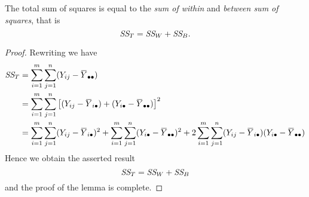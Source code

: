 \begin{lemma}
    \label{lem:an01}
    The total sum of squares is equal to the \textit{sum of within} and \textit{between sum of squares}, that is 
    \begin{equation}
        \textit{SS}_{T} = \textit{SS}_{W} + \textit{SS}_{B}.
    \end{equation}
\end{lemma}
\begin{proof}
    Rewriting we have 
    \begin{align*}
        \CS{T} &= \sum^m_{i=1} \sum^n_{j=1} (Y_{ij} - \ols{Y}_{\bullet \bullet })\\
        &= \sum^m_{i=1} \sum^n_{j=1} \left[ (Y_{ij} - \ols{Y}_{i \bullet }) + (Y_{i\bullet} - \ols{Y}_{\bullet \bullet }) \right]^2\\
        &= \sum^m_{i=1} \sum^n_{j=1} (Y_{ij} - \ols{Y}_{i \bullet })^2 + \sum^m_{i=1} \sum^n_{j=1}(Y_{i\bullet} - \ols{Y}_{\bullet \bullet })^2
        + 2 \sum^m_{i=1} \sum^n_{j=1} (Y_{ij} - \ols{Y}_{i \bullet })(Y_{i\bullet} - \ols{Y}_{\bullet \bullet })\\
    \end{align*}
    Hence we obtain the asserted result
    \[
        \textit{SS}_{T} = \textit{SS}_{W} + \textit{SS}_{B}
    \]
    and the proof of the lemma is complete.
\end{proof}

